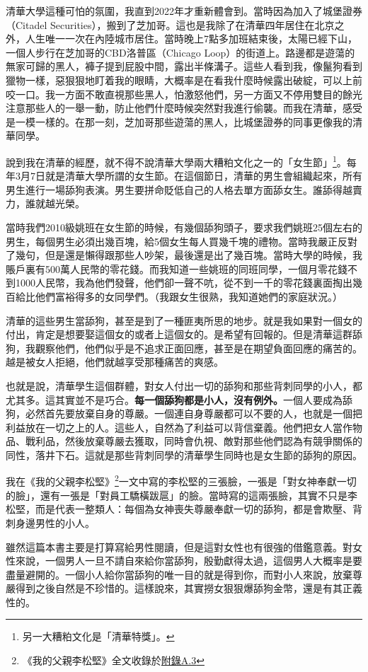 清華大學這種可怕的氛圍，我直到2022年才重新體會到。當時因為加入了城堡證券（Citadel Securities），搬到了芝加哥。這也是我除了在清華四年居住在北京之外，人生唯一一次在內陸城市居住。當時晚上7點多加班結束後，太陽已經下山，一個人步行在芝加哥的CBD洛普區（Chicago Loop）的街道上。路邊都是遊蕩的無家可歸的黑人，褲子提到屁股中間，露出半條溝子。這些人看到我，像鬣狗看到獵物一樣，惡狠狠地盯着我的眼睛，大概率是在看我什麼時候露出破綻，可以上前咬一口。我一方面不敢直視那些黑人，怕激怒他們，另一方面又不停用雙目的餘光注意那些人的一舉一動，防止他們什麼時候突然對我進行偷襲。而我在清華，感受是一模一樣的。在那一刻，芝加哥那些遊蕩的黑人，比城堡證券的同事更像我的清華同學。

說到我在清華的經歷，就不得不說清華大學兩大糟粕文化之一的「女生節」\footnote{另一大糟粕文化是「清華特獎」。}。每年3月7日就是清華大學所謂的女生節。在這個節日，清華的男生會組織起來，所有男生進行一場舔狗表演。男生要拼命貶低自己的人格去單方面舔女生。誰舔得越賣力，誰就越光榮。

當時我們2010級姚班在女生節的時候，有幾個舔狗頭子，要求我們姚班25個左右的男生，每個男生必須出幾百塊，給5個女生每人買幾千塊的禮物。當時我嚴正反對了幾句，但是還是懶得跟那些人吵架，最後還是出了幾百塊。當時大學的時候，我賬戶裏有500萬人民幣的零花錢。而我知道一些姚班的同班同學，一個月零花錢不到1000人民幣，我為他們發聲，他們卻一聲不吭，從不到一千的零花錢裏面掏出幾百給比他們富裕得多的女同學們。（我跟女生很熟，我知道她們的家庭狀況。）

清華的這些男生當舔狗，甚至是到了一種匪夷所思的地步。就是我如果對一個女的付出，肯定是想要娶這個女的或者上這個女的。是希望有回報的。但是清華這群舔狗，我觀察他們，他們似乎是不追求正面回應，甚至是在期望負面回應的痛苦的。越是被女人拒絕，他們就越享受那種痛苦的爽感。

也就是說，清華學生這個群體，對女人付出一切的舔狗和那些背刺同學的小人，都尤其多。這其實並不是巧合。\textbf{每一個舔狗都是小人，沒有例外。}一個人要成為舔狗，必然首先要放棄自身的尊嚴。一個連自身尊嚴都可以不要的人，也就是一個把利益放在一切之上的人。這些人，自然為了利益可以背信棄義。他們把女人當作物品、戰利品，然後放棄尊嚴去獲取，同時會仇視、敵對那些他們認為有競爭關係的同性，落井下石。這就是那些背刺同學的清華學生同時也是女生節的舔狗的原因。

我在《我的父親李松堅》\footnote{《我的父親李松堅》全文收錄於\hyperref[3faces]{附錄A.3}}一文中寫的李松堅的三張臉，一張是「對女神奉獻一切的臉」，還有一張是「對員工驕橫跋扈」的臉。當時寫的這兩張臉，其實不只是李松堅，而是代表一整類人：每個為女神喪失尊嚴奉獻一切的舔狗，都是會欺壓、背刺身邊男性的小人。

雖然這篇本書主要是打算寫給男性閱讀，但是這對女性也有很強的借鑑意義。對女性來說，一個男人一旦不請自來給你當舔狗，殷勤獻得太過，這個男人大概率是要盡量避開的。一個小人給你當舔狗的唯一目的就是得到你，而對小人來說，放棄尊嚴得到之後自然是不珍惜的。這樣說來，其實撈女狠狠爆舔狗金幣，還是有其正義性的。